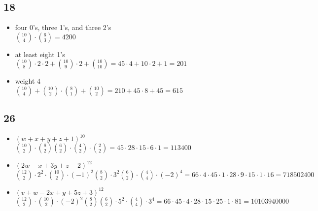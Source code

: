 \documentclass[a4paper]{article}
\begin{document}
\subsection{18}
    \begin{itemize}
      \item four 0's, three 1's, and three 2's\\
      $ \binom{10}{4}\cdot\binom{6}{3} =4200$
      \item at least eight 1's\\
      $\binom{10}{8}\cdot2\cdot2+\binom{10}{9}\cdot2+\binom{10}{10}=45\cdot4+10\cdot2+1=201$
      \item weight 4\\
      $\binom{10}{4}+\binom{10}{2}\cdot\binom{8}{1}+\binom{10}{2}=210+ 45\cdot 8+45=615$
    \end{itemize}

\subsection{26}
    \begin{itemize}
      \item $(w+x+y+z+1)^{10}$\\
      $\binom{10}{2}\cdot\binom{8}{2}\binom{6}{2}\cdot\binom{4}{2}\cdot\binom{2}{2}=45\cdot 28\cdot 15\cdot 6\cdot 1=113400$
      \item $(2w-x+3y+z-2)^{12}$\\
      $\binom{12}{2}\cdot2^2\cdot\binom{10}{2}\cdot(-1)^2\binom{8}{2}\cdot3^2\binom{6}{2}\cdot\binom{4}{4}\cdot(-2)^4=66\cdot4\cdot 45\cdot 1\cdot 28\cdot 9\cdot 15\cdot 1\cdot 16=718502400$
      \item $(v+w-2x+y+5z+3)^{12}$\\
      $\binom{12}{2}\cdot\binom{10}{2}\cdot(-2)^2\binom{8}{2}\binom{6}{2}\cdot5^2\cdot\binom{4}{4}\cdot3^4=66\cdot 45\cdot 4\cdot 28\cdot 15\cdot 25\cdot 1 \cdot 81=10103940000$
    \end{itemize}
\end{document}
